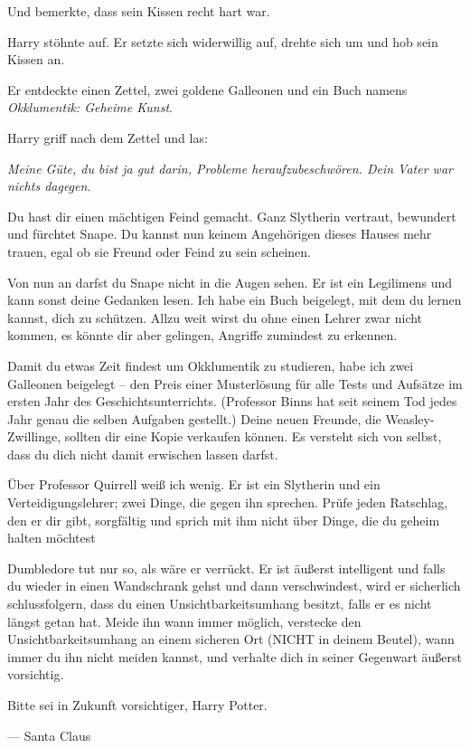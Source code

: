 {Und bemerkte, dass sein Kissen recht hart war.

Harry stöhnte auf. Er setzte sich widerwillig auf, drehte sich um und hob sein Kissen an.

Er entdeckte einen Zettel, zwei goldene Galleonen und ein Buch namens \emph{Okklumentik: Geheime Kunst}.

Harry griff nach dem Zettel und las:

\emph{Meine Güte, du bist ja gut darin, Probleme heraufzubeschwören. Dein Vater war nichts dagegen.}

Du hast dir einen mächtigen Feind gemacht. Ganz Slytherin vertraut, bewundert und fürchtet Snape. Du kannst nun keinem Angehörigen dieses Hauses mehr trauen, egal ob sie Freund oder Feind zu sein scheinen.

Von nun an darfst du Snape nicht in die Augen sehen. Er ist ein Legilimens und kann sonst deine Gedanken lesen. Ich habe ein Buch beigelegt, mit dem du lernen kannst, dich zu schützen. Allzu weit wirst du ohne einen Lehrer zwar nicht kommen, es könnte dir aber gelingen, Angriffe zumindest zu erkennen.

Damit du etwas Zeit findest um Okklumentik zu studieren, habe ich zwei Galleonen beigelegt -- den Preis einer Musterlösung für alle Tests und Aufsätze im ersten Jahr des Geschichtsunterrichts. (Professor Binns hat seit seinem Tod jedes Jahr genau die selben Aufgaben gestellt.) Deine neuen Freunde, die Weasley-Zwillinge, sollten dir eine Kopie verkaufen können. Es versteht sich von selbst, dass du dich nicht damit erwischen lassen darfst.

Über Professor Quirrell weiß ich wenig. Er ist ein Slytherin und ein Verteidigungslehrer; zwei Dinge, die gegen ihn sprechen. Prüfe jeden Ratschlag, den er dir gibt, sorgfältig und sprich mit ihm nicht über Dinge, die du geheim halten möchtest

Dumbledore tut nur so, als wäre er verrückt. Er ist äußerst intelligent und falls du wieder in einen Wandschrank gehst und dann verschwindest, wird er sicherlich schlussfolgern, dass du einen Unsichtbarkeitsumhang besitzt, falls er es nicht längst getan hat. Meide ihn wann immer möglich, verstecke den Unsichtbarkeitsumhang an einem sicheren Ort (NICHT in deinem Beutel), wann immer du ihn nicht meiden kannst, und verhalte dich in seiner Gegenwart äußerst vorsichtig.

Bitte sei in Zukunft vorsichtiger, Harry Potter.

--- Santa Claus

}
